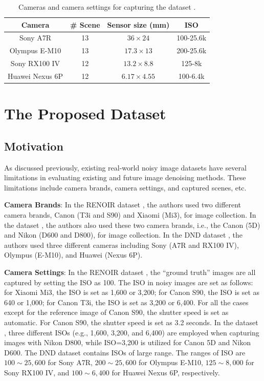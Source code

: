 \begin{table}[t!]
\caption{Cameras and camera settings for capturing the dataset \cite{dnd2017}.}

\label{tab6-3}
\begin{center}
\small
\renewcommand\arraystretch{1.2}
\begin{tabular*}{1\textwidth}{@{\extracolsep{\fill}}cccc}
\hline
Camera
&
\# Scene
&
Sensor size (mm)
&
ISO
\\
\hline
Sony A7R & 13  & $36\times24$  & 100-25.6k
\\
\hline
Olympus E-M10 & 13  & $17.3\times13$  & 200-25.6k 
\\
\hline   
Sony RX100 IV & 12 & $13.2\times8.8$  & 125-8k 
\\
\hline   
Huawei Nexus 6P & 12 & $6.17\times4.55$  & 100-6.4k 
\\
\hline
\end{tabular*}
\end{center}
\vspace{-4mm}
\end{table}


\section{The Proposed Dataset}

\subsection{Motivation}
As discussed previously, existing real-world noisy image datasets \cite{RENOIR2014,crosschannel2016,dnd2017} have several limitations in evaluating existing and future image denoising methods. These limitations include camera brands, camera settings, and captured scenes, etc.

\textbf{Camera Brands}: In the RENOIR dataset \cite{RENOIR2014}, the authors used two different camera brands, Canon (T3i and S90) and Xiaomi (Mi3), for image collection. In the dataset \cite{crosschannel2016}, the authors also used these two camera brands, i.e., the Canon (5D) and Nikon (D600 and D800), for image collection. In the DND dataset \cite{dnd2017}, the authors used three different cameras including Sony (A7R and RX100 IV), Olympus (E-M10), and Huawei (Nexus 6P).

\textbf{Camera Settings}: In the RENOIR dataset \cite{RENOIR2014}, the ``ground truth'' images are all captured by setting the ISO as 100. The ISO in noisy images are set as follows: for Xiaomi Mi3, the ISO is set as 1,600 or 3,200; for Canon S90, the ISO is set as 640 or 1,000; for Canon T3i, the ISO is set as 3,200 or 6,400. For all the cases except for the reference image of Canon S90, the shutter speed is set as automatic. For Canon S90, the shutter speed is set as 3.2 seconds. In the dataset \cite{crosschannel2016}, three different ISOs (e.g., 1,600, 3,200, and 6,400) are employed when capturing images with Nikon D800, while ISO=3,200 is utilized for Canon 5D and Nikon D600. The DND dataset \cite{dnd2017} contains ISOs of large range. The ranges of ISO are $100\sim25,600$ for Sony A7R, $200\sim25,600$ for Olympus E-M10, $125\sim8,000$ for Sony RX100 IV, and $100\sim6,400$ for Huawei Nexus 6P, respectively. 

